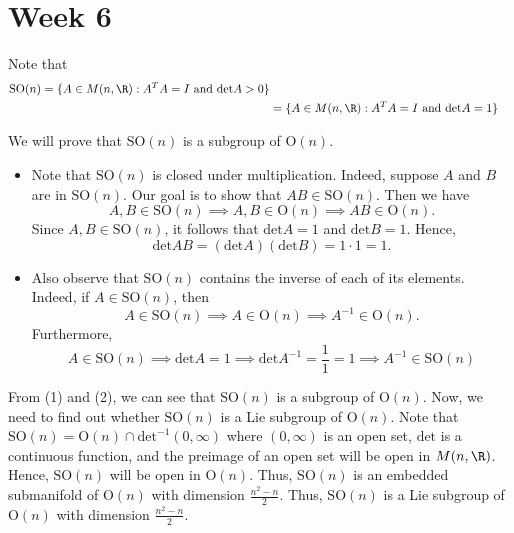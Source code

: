 \section{Week 6}

\begin{eg}
   Note that  
   \begin{align*}
       \text{SO}(n) = \{  A \in M(n,\R) : A^{T}A = I \ \text{and} \ \text{det}A > 0  \} \\  
       &= \{ A \in M(n,\R) : A^{T}A = I \ \text{and} \ \text{det}A = 1   \}   
    \end{align*}

    We will prove that \( \text{SO}(n)  \) is a subgroup of \( \text{O}(n) \). 
    \begin{itemize}
        \item Note that \( \text{SO}(n)  \) is closed under multiplication. Indeed, suppose \( A  \) and \( B  \) are in \( \text{SO}(n) \). Our goal is to show that \( AB \in \text{SO}(n) \). Then we have  
            \[  A,B \in \text{SO}(n)  \implies A,B \in \text{O}(n) \implies AB \in \text{O}(n).\]
            Since \( A,B  \in \text{SO}(n) \), it follows that \( \text{det}A = 1   \) and \( \text{det}B = 1  \). Hence, 
            \[  \text{det}AB = (\text{det}A) (\text{det}B ) = 1 \cdot 1 = 1. \]
        \item Also observe that \( \text{SO}(n)  \) contains the inverse of each of its elements. Indeed, if \( A \in \text{SO}(n) \), then 
            \[  A \in \text{SO}(n) \implies A \in \text{O}(n) \implies A^{-1} \in \text{O}(n). \tag{1} \]
            Furthermore, 
            \[ A \in \text{SO}(n) \implies \text{det}A = 1 \implies \text{det} A^{-1} = \frac{ 1 }{ 1 }  = 1 \implies A^{-1} \in \text{SO}(n) \tag{2}  \]
    \end{itemize}

    From (1) and (2), we can see that \( \text{SO}(n) \) is a subgroup of \( \text{O}(n) \). Now, we need to find out whether \( \text{SO}(n)  \) is a Lie subgroup of \( \text{O}(n) \). Note that \( \text{SO}(n) = \text{O}(n) \cap \text{det}^{-1}(0, \infty )  \) where \( (0,\infty ) \) is an open set, \( \text{det}  \) is a continuous function, and the preimage of an open set will be open in \( M(n,\R) \). Hence, \( \text{SO}(n) \) will be open in \( \text{O}(n) \). Thus, \( \text{SO}(n) \) is an embedded submanifold of \( \text{O}(n)  \) with dimension \( \frac{ n^{2} - n  }{  2  }  \). Thus, \( \text{SO}(n)  \) is a Lie subgroup of \( \text{O}(n) \) with dimension \( \frac{ n^{2} - n  }{  2  }  \).
\end{eg}

